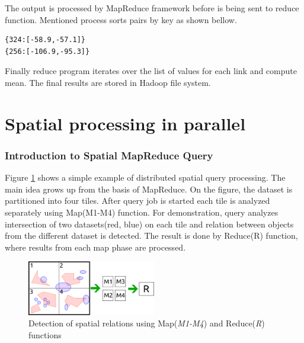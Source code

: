 \documentclass[a4paper,12pt,oneside]{report}
\begin{document}
The output is processed by MapReduce framework before is being sent to reduce function.
Mentioned process sorts pairs by key as shown bellow.
\begin{footnotesize}
\begin{lstlisting}[style=mybash]
{324:[-58.9,-57.1]}
{256:[-106.9,-95.3]}
\end{lstlisting}\end{footnotesize}


Finally reduce program iterates over the list of values for each link and compute mean.
 The final results are stored in Hadoop file system.
 


\section{Spatial processing in parallel}
	\subsubsection{Introduction to Spatial MapReduce Query}
Figure \ref{fig:mapred_spatial} shows a simple example of distributed spatial query processing. The main idea 
grows up from the basis of MapReduce. On the figure, the dataset is partitioned into four tiles. After 
query job is started each tile is analyzed separately using Map(M1-M4) function. For demonstration, 
query analyzes intersection of two datasets(red, blue) on each tile and relation between 
objects from the different dataset is detected. The result is done by Reduce(R) function, where results from each
map phase are processed.

\begin{figure}[h!]
    \centering
    \includegraphics[width=0.5\textwidth]{./img/mapred_spatial.pdf}
    \caption[Spatial Map Reduce]{\centering Detection of spatial relations using Map(\textit{M1-M4}) and Reduce(\textit{R}) functions}
        \label{fig:mapred_spatial}
 \end{figure}
\paragraph{}
\end{document}
